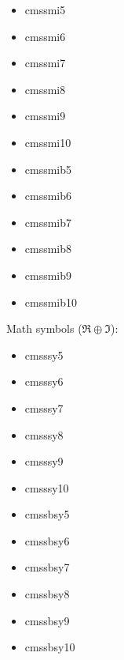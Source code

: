 \documentclass{amsart}
\begin{document}
\noindent{}\textwidth\parbox[t]{0.235\textwidth}{
\begin{itemize}[leftmargin=*]
\item \textsf{cmssmi5}
\item \textsf{cmssmi6}
\item \textsf{cmssmi7}
\end{itemize}}\parbox[t]{0.235\textwidth}{\begin{itemize}[leftmargin=*]
\item \textsf{cmssmi8}
\item \textsf{cmssmi9}
\item \textsf{cmssmi10}
\end{itemize}}\parbox[t]{0.235\textwidth}{\begin{itemize}[leftmargin=*]
\item \textsf{cmssmib5}
\item \textsf{cmssmib6}
\item \textsf{cmssmib7}
\end{itemize}}\parbox[t]{0.235\textwidth}{\begin{itemize}[leftmargin=*]
\item \textsf{cmssmib8}
\item \textsf{cmssmib9}
\item \textsf{cmssmib10}
\end{itemize}}

\bigskip

Math symbols ($\Re\oplus \Im  $):

\nobreak

\noindent{}\textwidth\parbox[t]{0.235\textwidth}{
\begin{itemize}[leftmargin=*]
\item \textsf{cmsssy5}
\item \textsf{cmsssy6}
\item \textsf{cmsssy7}
\end{itemize}}\parbox[t]{0.235\textwidth}{\begin{itemize}[leftmargin=*]
\item \textsf{cmsssy8}
\item \textsf{cmsssy9}
\item \textsf{cmsssy10}
\end{itemize}}\parbox[t]{0.235\textwidth}{\begin{itemize}[leftmargin=*]
\item \textsf{cmssbsy5}
\item \textsf{cmssbsy6}
\item \textsf{cmssbsy7}
\end{itemize}}\parbox[t]{0.235\textwidth}{\begin{itemize}[leftmargin=*]
\item \textsf{cmssbsy8}
\item \textsf{cmssbsy9}
\item \textsf{cmssbsy10}
\end{itemize}}
\end{document}
